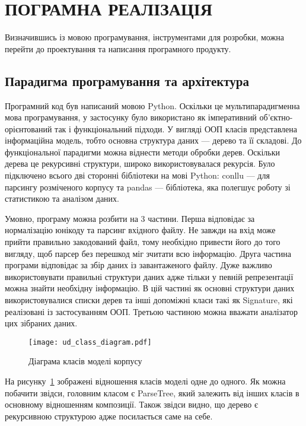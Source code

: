 \section{ПОГРАМНА РЕАЛІЗАЦІЯ}
Визначившись із мовою програмування, інструментами для розробки, можна перейти
до проектування та написання програмного продукту.

\subsection{Парадигма програмування та архітектура}
Програмний код був написаний мовою Python. Оскільки це мультипарадигменна мова програмування,
у застосунку було використано як імперативний об'єктно-орієнтований так і функціональний підходи.
У вигляді ООП класів представлена інформаційна модель, тобто основна структура
даних --- дерево та її складові. До функціональної парадигми можна віднести методи обробки
дерев. Оскільки дерева це рекурсивні структури, широко використовувалася рекурсія.
Було підключено всього дві сторонні бібліотеки на мові Python: conllu --- для парсингу розміченого
корпусу та pandas --- бібліотека, яка полегшує роботу зі статистикою та аналізом даних.

Умовно, програму можна розбити на 3 частини. Перша відповідає за нормалізацію
юнікоду та парсинг вхідного файлу. Не завжди на вхід може прийти правильно
закодований файл, тому необхідно привести його до того вигляду, щоб парсер без
перешкод міг зчитати всю інформацію. Друга частина
програми відповідає за збір даних із завантаженого файлу. Дуже важливо використовувати
правильні структури даних адже тільки у певній репрезентації можна знайти необхідну
інформацію. В цій частині як основні структури даних використовувалися
списки дерев та інші допоміжні класи такі як Signature, які реалізовані із застосуванням ООП.
Третьою частиною можна вважати аналізатор цих зібраних даних.

\begin{figure}[p]
  \begin{center}
    \texttt{[image: ud\_class\_diagram.pdf]}
  \end{center}
  \caption{Діаграма класів моделі корпусу}
  \label{img:class_diagram}
\end{figure}
\newpage

На рисунку~\ref{img:class_diagram} зображені відношення класів моделі одне до одного.
Як можна побачити звідси, головним класом є ParseTree, який залежить від інших класів
в основному відношенням композиції. Також звідси видно, що дерево є рекурсивною
структурою адже посилається саме на себе.

